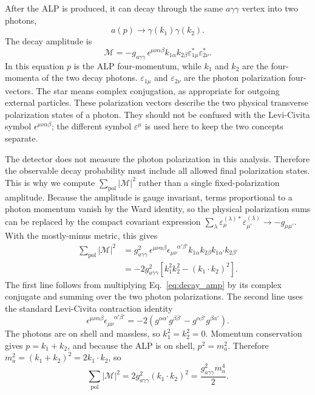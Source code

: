 \documentclass[12pt,a4paper]{article}
\newcommand{\gagg}{g_{a\gamma\gamma}}
\newcommand{\ma}{m_a}
\begin{document}
After the ALP is produced, it can decay through the same
$a\gamma\gamma$ vertex into two photons,
\begin{equation}
    a(p)\to\gamma(k_1)\gamma(k_2).
\end{equation}
The decay amplitude is
\begin{equation}
    \mathcal{M}
    =
    -\gagg\,
    \epsilon^{\mu\nu\alpha\beta}
    k_{1\alpha}k_{2\beta}
    \varepsilon^{*}_{1\mu}\varepsilon^{*}_{2\nu}.
    \label{eq:decay_amp}
\end{equation}
In this equation $p$ is the ALP four-momentum, while
$k_1$ and $k_2$ are the four-momenta of the two decay photons.
$\varepsilon_{1\mu}$ and $\varepsilon_{2\nu}$ are the photon polarization
four-vectors. The star means complex conjugation, as appropriate for outgoing
external particles. These polarization vectors describe the two physical
transverse polarization states of a photon. They should not be confused with
the Levi-Civita symbol $\epsilon^{\mu\nu\alpha\beta}$; the different symbol
$\varepsilon^\mu$ is used here to keep the two concepts separate.

The detector does not measure the photon polarization in this analysis.
Therefore the observable decay probability must include all allowed final
polarization states. This is why we compute
$\sum_\mathrm{pol}|\mathcal{M}|^2$ rather than a single fixed-polarization
amplitude. Because the amplitude is gauge invariant, terms proportional to a
photon momentum vanish by the Ward identity, so the physical polarization sums
can be replaced by the compact covariant expression
$\sum_\lambda \varepsilon_\mu^{(\lambda)*}
\varepsilon_{\mu'}^{(\lambda)}\to -g_{\mu\mu'}$. With the mostly-minus metric,
this gives
\begin{align}
    \sum_\mathrm{pol}|\mathcal{M}|^2
    &=
    \gagg^2\,
    \epsilon^{\mu\nu\alpha\beta}
    \epsilon_{\mu\nu}^{\phantom{\mu\nu}\alpha'\beta'}
    k_{1\alpha}k_{2\beta}k_{1\alpha'}k_{2\beta'} \nonumber\\
    &=
    -2\gagg^2
    \left[
      k_1^2 k_2^2 - (k_1\cdot k_2)^2
    \right].
    \label{eq:decay_m2_step}
\end{align}
The first line follows from multiplying Eq.~\eqref{eq:decay_amp} by its complex
conjugate and summing over the two photon polarizations. The second line uses
the standard Levi-Civita contraction identity
\begin{equation}
    \epsilon^{\mu\nu\alpha\beta}
    \epsilon_{\mu\nu}^{\phantom{\mu\nu}\alpha'\beta'}
    =
    -2\left(
      g^{\alpha\alpha'}g^{\beta\beta'}
      -
      g^{\alpha\beta'}g^{\beta\alpha'}
    \right).
    \label{eq:levicivita_contraction}
\end{equation}
The photons are on shell and massless, so $k_1^2=k_2^2=0$. Momentum
conservation gives $p=k_1+k_2$, and because the ALP is on shell,
$p^2=\ma^2$. Therefore
$\ma^2=(k_1+k_2)^2=2k_1\cdot k_2$, so
\begin{equation}
    \sum_\mathrm{pol}|\mathcal{M}|^2
    =
    2\gagg^2(k_1\cdot k_2)^2
    =
    \frac{\gagg^2\ma^4}{2}.
    \label{eq:decay_m2}
\end{equation}
\end{document}
